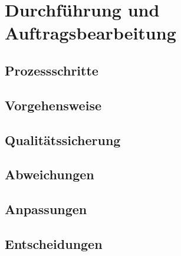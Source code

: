 
\section{Durchführung und Auftragsbearbeitung}
\label{sec:durchfuehrung}

\subsection{Prozessschritte}
\label{subsec:prozessschritte}

\subsection{Vorgehensweise}
\label{subsec:vorgehensweise}

\subsection{Qualitätssicherung}
\label{subsec:qualitaetssicherung}

\subsection{Abweichungen}
\label{subsec:abweichungen}

\subsection{Anpassungen}
\label{subsec:anpassungen}

\subsection{Entscheidungen}
\label{subsec:entscheidungen}